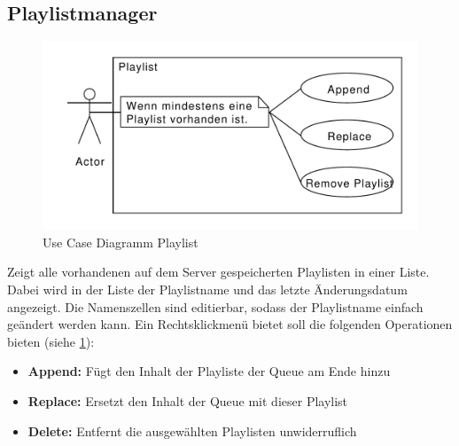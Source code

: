\subsection{Playlistmanager}
\begin{figure}[htb!]
    \centering
    \includegraphics[width=\textwidth]{./gfx/usec/playlist}
    \caption{Use Case Diagramm Playlist}
    \label{uc_playlist}
\end{figure}
Zeigt alle vorhandenen auf dem Server gespeicherten Playlisten in einer Liste.
Dabei wird in der Liste der Playlistname und das letzte Änderungsdatum angezeigt.
Die Namenszellen sind editierbar, sodass der Playlistname einfach geändert werden kann. 
Ein Rechtsklickmenü bietet soll die folgenden Operationen bieten (siehe \ref{uc_playlist}):
\begin{itemize}
    \item \textbf{Append:} Fügt den Inhalt der Playliste der Queue am Ende hinzu
    \item \textbf{Replace:} Ersetzt den Inhalt der Queue mit dieser Playlist
    \item \textbf{Delete:} Entfernt die ausgewählten Playlisten unwiderruflich
\end{itemize}   


